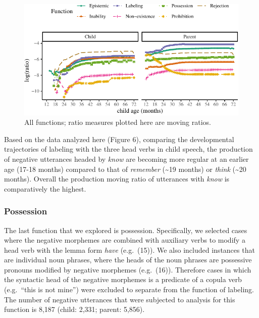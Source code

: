 \documentclass[10pt, letterpaper]{article}
\newenvironment{CodeChunk}{}{}
\begin{document}
\begin{figure}[h!]

\begin{CodeChunk}


\begin{center}\includegraphics{figs/all-1} \end{center}

\end{CodeChunk}

\caption[This image spans both columns]{All functions; ratio measures plotted here are moving ratios.}\label{fig:all}
\end{figure}

Based on the data analyzed here (Figure 6), comparing the developmental
trajectories of labeling with the three head verbs in child speech, the
production of negative utterances headed by \emph{know} are becoming
more regular at an earlier age (17-18 months) compared to that of
\emph{remember} (\textasciitilde19 months) or \emph{think}
(\textasciitilde20 months). Overall the production moving ratio of
utterances with \emph{know} is comparatively the highest.

\hypertarget{possession}{%
\subsubsection{Possession}\label{possession}}

The last function that we explored is possession. Specifically, we
selected cases where the negative morphemes are combined with auxiliary
verbs to modify a head verb with the lemma form \emph{have} (e.g.~(15)).
We also included instances that are individual noun phrases, where the
heads of the noun phrases are possessive pronouns modified by negative
morphemes (e.g.~(16)). Therefore cases in which the syntactic head of
the negative morphemes is a predicate of a copula verb (e.g.~``this is
not mine'') were excluded to separate from the function of labeling. The
number of negative utterances that were subjected to analysis for this
function is 8,187 (child: 2,331; parent: 5,856).
\end{document}
